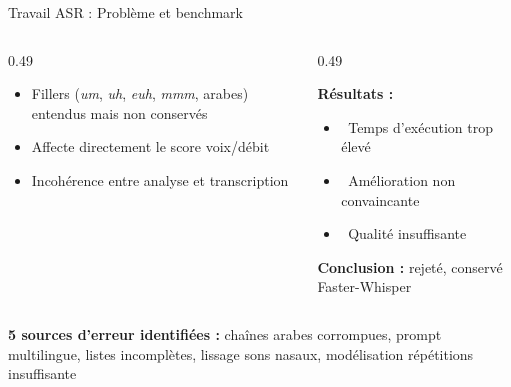 \documentclass[10pt,aspectratio=169]{beamer}
\newcommand{\xmark}{\textcolor{danger}{\ding{55}}}
\begin{document}
\begin{frame}{Travail ASR : Problème et benchmark}
\begin{columns}[T]
\begin{column}{0.49\textwidth}
\begin{tcolorbox}[title=Problème identifié, colframe=danger, colback=danger!3]
\small
\begin{itemize}
    \item Fillers (\textit{um}, \textit{uh}, \textit{euh}, \textit{mmm}, arabes) entendus mais non conservés
    \item Affecte directement le score voix/débit
    \item Incohérence entre analyse et transcription
\end{itemize}
\end{tcolorbox}
\end{column}
\begin{column}{0.49\textwidth}
\begin{tcolorbox}[title=Benchmark CrisperWhisper, colframe=warning!60!black, colback=warning!8]
\small
\textbf{Résultats :}
\begin{itemize}
    \item \xmark~Temps d'exécution trop élevé
    \item \xmark~Amélioration non convaincante
    \item \xmark~Qualité insuffisante
\end{itemize}
\textbf{Conclusion :} rejeté, conservé Faster-Whisper
\end{tcolorbox}
\end{column}
\end{columns}
\vspace{0.3cm}
\begin{keybox}
\textbf{5 sources d'erreur identifiées :} chaînes arabes corrompues, prompt multilingue, listes incomplètes, lissage sons nasaux, modélisation répétitions insuffisante
\end{keybox}
\end{frame}
\end{document}
